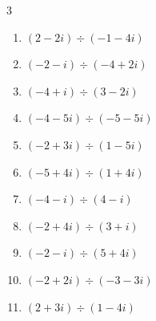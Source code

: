 \begin{multicols}{3}
\begin{enumerate}

  \item $\displaystyle (2-2i)\div(-1-4i)$


  \item $\displaystyle (-2-i)\div(-4+2i)$


  \item $\displaystyle (-4+i)\div(3-2i)$


  \item $\displaystyle (-4-5i)\div(-5-5i)$


  \item $\displaystyle (-2+3i)\div(1-5i)$


\columnbreak %

  \item $\displaystyle (-5+4i)\div(1+4i)$


  \item $\displaystyle (-4-i)\div(4-i)$


  \item $\displaystyle (-2+4i)\div(3+i)$


  \item $\displaystyle (-2-i)\div(5+4i)$


  \item $\displaystyle (-2+2i)\div(-3-3i)$


  \item $\displaystyle (2+3i)\div(1-4i)$



\end{enumerate}
\end{multicols}
